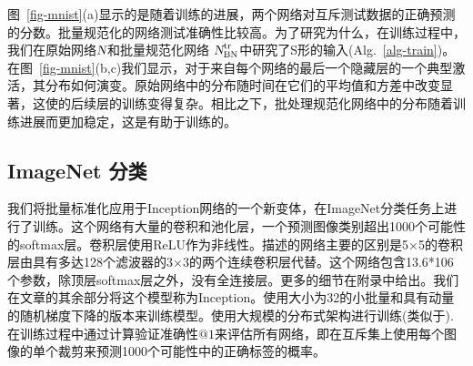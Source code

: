 \documentclass[twocolumn]{article}
\begin{document}
图~\ref{fig-mnist}(a)显示的是随着训练的进展，两个网络对互斥测试数据的正确预测的分数。批量规范化的网络测试准确性比较高。为了研究为什么，在训练过程中，我们在原始网络$\text{\sl N}$和批量规范化网络 $\text{\sl N}_\mathrm{BN}^\mathrm{tr}$中研究了S形的输入(Alg.~\ref{alg-train})。在图~\ref{fig-mnist}(b,c)我们显示，对于来自每个网络的最后一个隐藏层的一个典型激活，其分布如何演变。原始网络中的分布随时间在它们的平均值和方差中改变显著，这使的后续层的训练变得复杂。相比之下，批处理规范化网络中的分布随着训练进展而更加稳定，这是有助于训练的。

\subsection{ImageNet 分类}
\label{sec-results}

我们将批量标准化应用于Inception网络\cite{inception}的一个新变体，在ImageNet分类任务\cite{imagenet}上进行了训练。这个网络有大量的卷积和池化层，一个预测图像类别超出1000个可能性的softmax层。卷积层使用ReLU作为非线性。\cite{inception}描述的网络主要的区别是5×5的卷积层由具有多达128个滤波器的3×3的两个连续卷积层代替。这个网络包含13.6*106个参数，除顶层softmax层之外，没有全连接层。更多的细节在附录中给出。我们在文章的其余部分将这个模型称为Inception。使用大小为32的小批量和具有动量的随机梯度下降的版本来训练模型。使用大规模的分布式架构进行训练(类似于\cite{dist-belief}).在训练过程中通过计算验证准确性$@1$来评估所有网络，即在互斥集上使用每个图像的单个裁剪来预测1000个可能性中的正确标签的概率。
\end{document}
